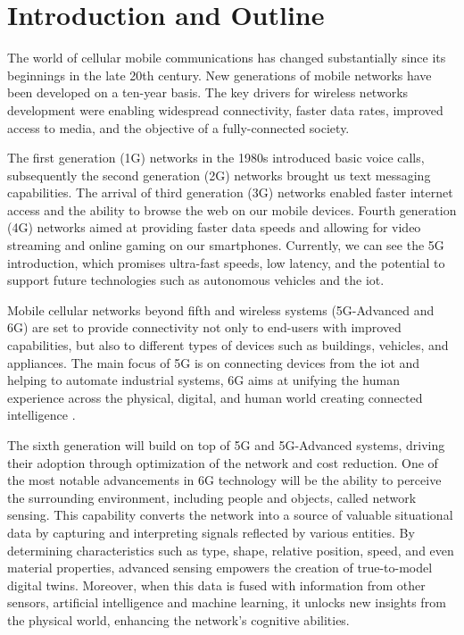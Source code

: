 \chapter{Introduction and Outline}
\label{chap_intro}

The world of cellular mobile communications has changed substantially since its beginnings in the late 20th century.
New generations of mobile networks have been developed on a ten-year basis. The key drivers for wireless networks development were enabling widespread connectivity, faster data rates, improved access to media, and the objective of a fully-connected society.

The first generation (1G) networks in the 1980s introduced basic voice calls, subsequently the second generation (2G) networks brought us text messaging capabilities. The arrival of third generation (3G) networks enabled faster internet access and the ability to browse the web on our mobile devices. 
Fourth generation (4G) networks aimed at providing faster data speeds and allowing for video streaming and online gaming on our smartphones. 
Currently, we can see the \gls{5G} introduction, which promises ultra-fast speeds, low latency, and the potential to support future technologies such as autonomous vehicles and the \gls{iot}. 

Mobile cellular networks beyond fifth and wireless systems (\gls{5G}-Advanced and 6G) are set to provide connectivity not only to end-users with improved capabilities, but also to different types of devices such as buildings, vehicles, and appliances.
The main focus of \gls{5G} is on connecting devices from the \gls{iot} and helping to automate industrial systems, 6G aims at unifying the human experience across the physical, digital, and human world creating connected intelligence \cite{6G-explained-NOKIA}.

The sixth generation will build on top of \gls{5G} and \gls{5G}-Advanced systems, driving their adoption through optimization of the network and cost reduction. 
One of the most notable advancements in 6G technology will be the ability to perceive the surrounding environment, including people and objects, called network sensing. This capability converts the network into a source of valuable situational data by capturing and interpreting signals reflected by various entities. 
By determining characteristics such as type, shape, relative position, speed, and even material properties, advanced sensing empowers the creation of true-to-model digital twins.
Moreover, when this data is fused with information from other sensors, artificial intelligence and machine learning, it unlocks new insights from the physical world, enhancing the network's cognitive abilities.

